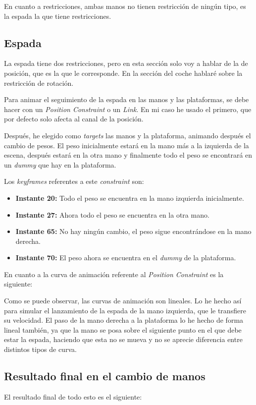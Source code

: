 \bigskip

En cuanto a restricciones, ambas manos no tienen restricción de ningún tipo, es la espada la que tiene restricciones.


\subsection{Espada}


La espada tiene dos restricciones, pero en esta sección solo voy a hablar de la de posición, que es la que le corresponde. En la sección del coche hablaré sobre la restricción de rotación.

\bigskip

Para animar el seguimiento de la espada en las manos y las plataformas, se debe hacer con un \textit{Position Constraint} o un \textit{Link}. En mi caso he usado el primero, que por defecto solo afecta al canal de la posición.

\bigskip

Después, he elegido como \textit{targets} las manos y la plataforma, animando después el cambio de pesos. El peso inicialmente estará en la mano más a la izquierda de la escena, después estará en la otra mano y finalmente todo el peso se encontrará en un \textit{dummy} que hay en la plataforma.


Los \textit{keyframes} referentes a este \textit{constraint} son:

\begin{itemize}
    \item \textbf{Instante 20: }Todo el peso se encuentra en la mano izquierda inicialmente.
    \item \textbf{Instante 27: }Ahora todo el peso se encuentra en la otra mano.
    \item \textbf{Instante 65: }No hay ningún cambio, el peso sigue encontrándose en la mano derecha.
    \item \textbf{Instante 70: }El peso ahora se encuentra en el \textit{dummy} de la plataforma.
\end{itemize}

\bigskip

En cuanto a la curva de animación referente al \textit{Position Constraint} es la siguiente:


Como se puede observar, las curvas de animación son lineales. Lo he hecho así para simular el lanzamiento de la espada de la mano izquierda, que le transfiere su velocidad. El paso de la mano derecha a la plataforma lo he hecho de forma lineal también, ya que la mano se posa sobre el siguiente punto en el que debe estar la espada, haciendo que esta no se mueva y no se aprecie diferencia entre distintos tipos de curva.

\subsection{Resultado final en el cambio de manos}

El resultado final de todo esto es el siguiente:

